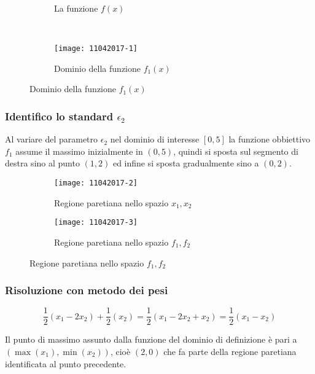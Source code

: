 \documentclass[\main/main.tex]{subfiles}
\begin{document}
\begin{figure}
  \begin{subfigure}{0.45\textwidth}
    \caption{La funzione $f(x)$}
    \label{func_1}
  \end{subfigure}
  ~
  \begin{subfigure}{0.45\textwidth}
    \texttt{[image: 11042017-1]}
    \caption{Dominio della funzione $f_1(x)$}
  \end{subfigure}
\end{figure}

\subsubsection*{Identifico lo standard $\epsilon_2$}
Al variare del parametro $\epsilon_2$ nel dominio di interesse $[0,5]$ la funzione obbiettivo $f_1$ assume il massimo inizialmente in $(0,5)$, quindi si sposta sul segmento di destra sino al punto $(1,2)$ ed infine si sposta gradualmente sino a $(0,2)$.

\begin{figure}
  \begin{subfigure}{0.45\textwidth}
    \texttt{[image: 11042017-2]}
    \caption{Regione paretiana nello spazio $x_1, x_2$}
  \end{subfigure}
  \begin{subfigure}{0.45\textwidth}
    \texttt{[image: 11042017-3]}
    \caption{Regione paretiana nello spazio $f_1, f_2$}
  \end{subfigure}
\end{figure}

\subsubsection*{Risoluzione con metodo dei pesi}
\[
  \frac{1}{2}(x_1 - 2x_2) + \frac{1}{2}(x_2) = \frac{1}{2}(x_1 - 2x_2 + x_2) = \frac{1}{2}(x_1 - x_2)
\]

Il punto di massimo assunto dalla funzione del dominio di definizione è pari a $(\max(x_1), \min(x_2))$, cioè $(2,0)$ che fa parte della regione paretiana identificata al punto precedente.
\end{document}
